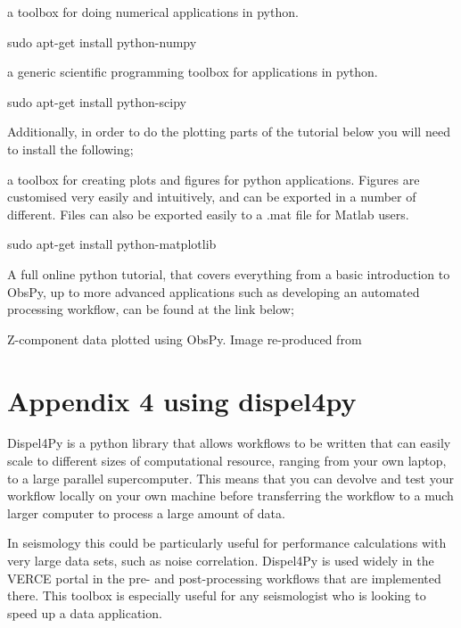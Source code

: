 \documentclass[english]{book}
\begin{document}
 \textendash{} a toolbox for doing numerical applications in python.

sudo apt-get install python-numpy

 \textendash{} a generic scientific programming toolbox for applications in
python.

sudo apt-get install python-scipy

Additionally, in order to do the plotting parts of the tutorial below
you will need to install the following;

 \textendash{} a toolbox for creating plots and figures for python
applications. Figures are customised very easily and intuitively, and
can be exported in a number of different. Files can also be exported
easily to a .mat file for Matlab users.

sudo apt-get install python-matplotlib


A full online python tutorial, that covers everything from a basic
introduction to ObsPy, up to more advanced applications such as
developing an automated processing workflow, can be found at the link
below;



 Z-component data plotted using ObsPy. Image
re-produced from



\chapter{Appendix 4 \textendash{} using dispel4py}
\label{\detokenize{Appendix4::doc}}\label{\detokenize{Appendix4:appendix-4-using-dispel4py}}
Dispel4Py is a python library that allows workflows to be written that
can easily scale to different sizes of computational resource, ranging
from your own laptop, to a large parallel supercomputer. This means that
you can devolve and test your workflow locally on your own machine
before transferring the workflow to a much larger computer to process a
large amount of data.

In seismology this could be particularly useful for performance
calculations with very large data sets, such as noise correlation.
Dispel4Py is used widely in the VERCE portal in the pre- and
post-processing workflows that are implemented there. This toolbox is
especially useful for any seismologist who is looking to speed up a data
application.
\end{document}
